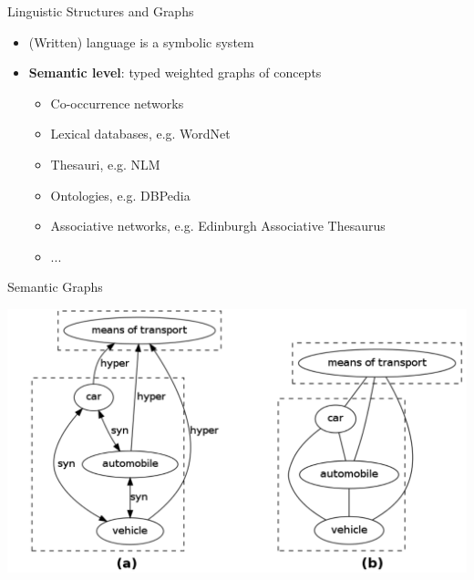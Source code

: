 \begin{frame}{Linguistic Structures and Graphs}
	
	\begin{itemize}
		\item (Written) language is a \alert{symbolic system}
		\item \textbf{Semantic level}: typed weighted graphs of concepts
		\begin{itemize}
				\item Co-occurrence networks
 
		\item Lexical databases, e.g. WordNet
		\item Thesauri, e.g. NLM
		\item Ontologies, e.g. DBPedia
		\item Associative networks, e.g.  Edinburgh Associative Thesaurus
		\item ...
		
		\end{itemize}
	\end{itemize}	
	
\end{frame}





\begin{frame}{Semantic Graphs}
	
	\begin{center}
  	\includegraphics[width=.99\textwidth]{figures/graph1}
  \end{center}	
\end{frame}





